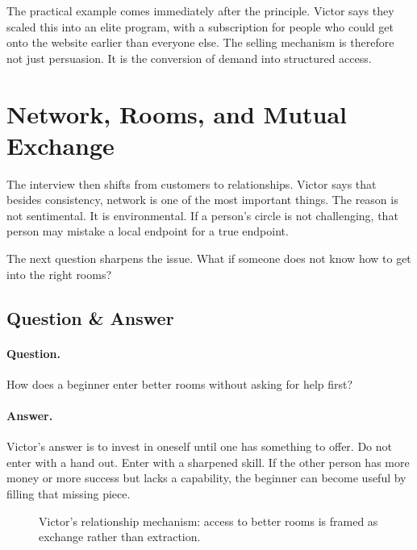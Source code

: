 The practical example comes immediately after the principle. Victor says they scaled this into an elite program, with a subscription for people who could get onto the website earlier than everyone else. The selling mechanism is therefore not just persuasion. It is the conversion of demand into structured access.

\section{Network, Rooms, and Mutual Exchange}

The interview then shifts from customers to relationships. Victor says that besides consistency, network is one of the most important things. The reason is not sentimental. It is environmental. If a person's circle is not challenging, that person may mistake a local endpoint for a true endpoint.

The next question sharpens the issue. What if someone does not know how to get into the right rooms?

\subsection{Question \& Answer}

\paragraph{Question.}
How does a beginner enter better rooms without asking for help first?

\paragraph{Answer.}
Victor's answer is to invest in oneself until one has something to offer. Do not enter with a hand out. Enter with a sharpened skill. If the other person has more money or more success but lacks a capability, the beginner can become useful by filling that missing piece.

\begin{figure}[h]
\centering
{}
\caption{Victor's relationship mechanism: access to better rooms is framed as exchange rather than extraction.}
\end{figure}

